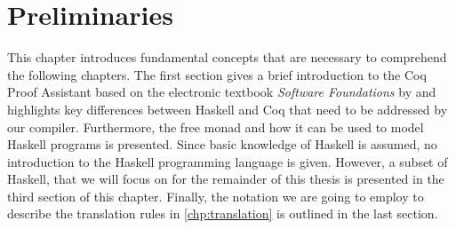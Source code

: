 \chapter{Preliminaries} \label{chp:preliminaries}
This chapter introduces fundamental concepts that are necessary to comprehend the following chapters.
The first section gives a brief introduction to the Coq Proof Assistant based on the electronic textbook \textit{Software Foundations} by \cite{Pierce:2019} and highlights key differences between Haskell and Coq that need to be addressed by our compiler.
Furthermore, the free monad and how it can be used to model Haskell programs is presented.
Since basic knowledge of Haskell is assumed, no introduction to the Haskell programming language is given.
However, a subset of Haskell, that we will focus on for the remainder of this thesis is presented in the third section of this chapter.
Finally, the notation we are going to employ to describe the translation rules in \autoref{chp:translation} is outlined in the last section.





